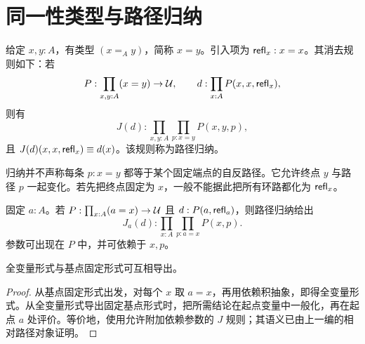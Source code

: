 \section{同一性类型与路径归纳}
\begin{definition}[同一性类型]
给定 $x,y:A$，有类型 $(x=_Ay)$，简称 $x=y$。引入项为 $\mathsf{refl}_x:x=x$。其消去规则如下：若
\[
P:\prod_{x,y:A}(x=y)\to\mathcal U,
\qquad d:\prod_{x:A}P(x,x,\mathsf{refl}_x),
\]
则有
\[
J(d):\prod_{x,y:A}\prod_{p:x=y}P(x,y,p),
\]
且 $J(d)(x,x,\mathsf{refl}_x)\equiv d(x)$。该规则称为路径归纳。
\end{definition}
\begin{remark}
归纳并不声称每条 $p:x=y$ 都等于某个固定端点的自反路径。它允许终点 $y$ 与路径 $p$ 一起变化。若先把终点固定为 $x$，一般不能据此把所有环路都化为 $\mathsf{refl}_x$。
\end{remark}
\begin{definition}[基点固定的路径归纳]
固定 $a:A$。若 $P:\prod_{x:A}(a=x)\to\mathcal U$ 且 $d:P(a,\mathsf{refl}_a)$，则路径归纳给出
\[
J_a(d):\prod_{x:A}\prod_{p:a=x}P(x,p).
\]
参数可出现在 $P$ 中，并可依赖于 $x,p$。
\end{definition}
\begin{proposition}[两种路径归纳的关系]
全变量形式与基点固定形式可互相导出。
\end{proposition}
\begin{proof}
从基点固定形式出发，对每个 $x$ 取 $a=x$，再用依赖积抽象，即得全变量形式。从全变量形式导出固定基点形式时，把所需结论在起点变量中一般化，再在起点 $a$ 处评价。等价地，使用允许附加依赖参数的 $J$ 规则；其语义已由上一编的相对路径对象证明。
\end{proof}

